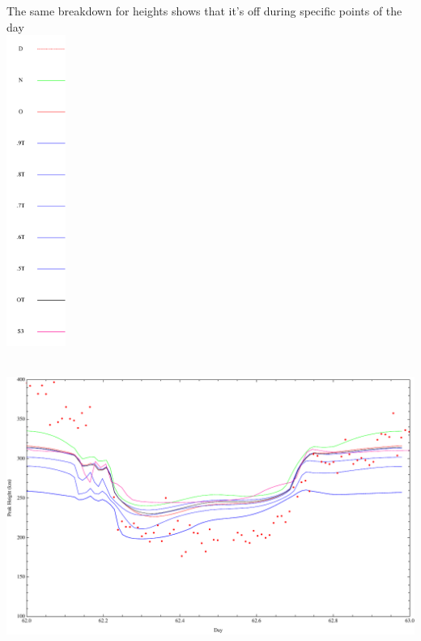 \documentclass[12pt]{article}
\begin{document}
 The same breakdown for heights shows that it's off during specific points of the day  \\
   \includegraphics[height=4in]{legend}
   \includegraphics[height=4in]{hm}
   \clearpage
\end{document}
